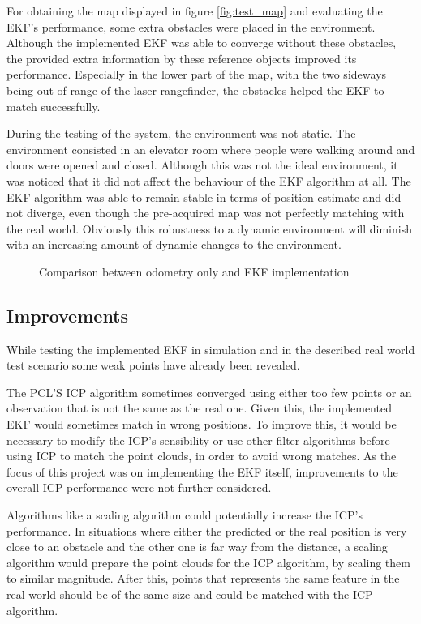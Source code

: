 For obtaining the map displayed in figure \ref{fig:test_map} and evaluating the EKF's performance, some extra obstacles were placed in the environment. Although the implemented EKF was able to converge without these obstacles, the provided extra information by these reference objects improved its performance. Especially in the lower part of the map, with the two sideways being out of range of the laser rangefinder, the obstacles helped the EKF to match successfully.

During the testing of the system, the environment was not static. The environment consisted in an elevator room where  people were walking around and doors were opened and closed. Although this was not the ideal environment, it was noticed that it did not affect the behaviour of the EKF algorithm at all. The EKF algorithm was able to remain stable in terms of position estimate and did not diverge, even though the pre-acquired map was not perfectly matching with the real world. Obviously this robustness to a dynamic environment will diminish with an increasing amount of dynamic changes to the environment.
\begin{figure}
	\centering
	\newlength\figureheight 
	\newlength\figurewidth 
	\setlength\figureheight{10cm} 
	\setlength\figurewidth{5cm}
	
      \caption{Comparison between odometry only and EKF implementation}	  
      \label{fig:ekf_odom} 
\end{figure}

\subsection{Improvements}
\label{subsec:Improvemnts}

While testing the implemented EKF in simulation and in the described real world test scenario some weak points have already been revealed.

The PCL'S ICP algorithm sometimes converged using either too few points or an observation that is not the same as the real one. Given this, the implemented EKF would sometimes match in wrong positions. To improve this, it would be necessary to modify the ICP's sensibility or use other filter algorithms before using ICP to match the point clouds, in order to avoid wrong matches. As the focus of this project was on implementing the EKF itself, improvements to the overall ICP performance were not further considered.

Algorithms like a scaling algorithm could potentially increase the ICP's performance. In situations where either the predicted or the real position is very close to an obstacle and the other one is far way from the distance, a scaling algorithm would prepare the point clouds for the ICP algorithm, by scaling them to similar magnitude. After this, points that represents the same feature in the real world should be of the same size and could be matched with the ICP algorithm.

